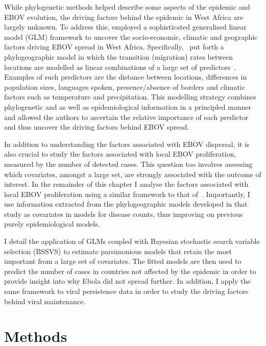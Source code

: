 While phylogenetic methods helped describe some aspects of the epidemic and EBOV evolution, the driving factors behind the epidemic in West Africa are largely unknown.
To address this, \cite{Dudas2017} employed a sophisticated generalised linear model (GLM) framework to uncover the socio-economic, climatic and geographic factors driving EBOV spread in West Africa.
Specifically,~\cite{Dudas2017} put forth a phylogeographic model in which the transition (migration) rates between locations are modelled as linear combinations of a large set of predictors~\citep{Lemey2014}.
Examples of such predictors are the distance between locations, differences in population sizes, languages spoken, presence/absence of borders and climatic factors such as temperature and precipitation.
This modelling strategy combines phylogenetic and as well as epidemiological information in a principled manner and allowed the authors to ascertain the relative importance of each predictor and thus uncover the driving factors behind EBOV spread.

In addition to understanding the factors associated with EBOV dispersal, it is also crucial to study the factors associated with local EBOV proliferation, measured by the number of detected cases.
This question too involves assessing which covariates, amongst a large set, are strongly associated with the outcome of interest.
In the remainder of this chapter I analyse the factors associated with local EBOV proliferation using a similar framework to that of~\cite{Dudas2017}.
Importantly, I use information extracted from the phylogeographic models developed in that study as covariates in models for disease counts, thus improving on previous purely epidemiological models.

I detail the application of GLMs coupled with Bayesian stochastic search variable selection (BSSVS) to estimate parsimonious models that retain the most important from a large set of covariates.
The fitted models are then used to predict the number of cases in countries not affected by the epidemic in order to provide insight into why Ebola did not spread further.
In addition, I apply the same framework to viral persistence data in order to study the driving factors behind viral maintenance.

\section{Methods}

